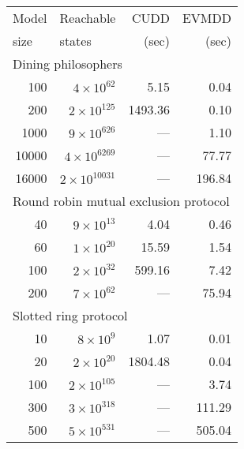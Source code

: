\documentclass[nocover]             %
{NASA}                       %
\begin{document}
{\small
\begin{table}[htb]
  \begin{center}
    \begin{tabular}{|r||r||r|r|}
      \hline
      \multicolumn{1}{|l||}{Model} & \multicolumn{1}{l||}{Reachable} & CUDD & EVMDD \\
      \multicolumn{1}{|l||}{size}  & \multicolumn{1}{l||}{states}  & (sec) & (sec) \\
      \hline
      \multicolumn{4}{|l|}{Dining philosophers}\\
      \hline
      100 & $4\times10^{62}$ &    5.15 &    0.04 \\
      200 & $2\times10^{125}$ & 1493.36 &    0.10 \\
      1000 & $9\times10^{626}$ &   --- &    1.10 \\
      10000 & $4\times10^{6269}$ &   --- &   77.77 \\
      16000 & $2\times10^{10031}$ &   --- &  196.84 \\
      \hline
      \multicolumn{4}{|l|}{Round robin mutual exclusion protocol}\\
      \hline
      40 & $9\times10^{13}$ &    4.04 &    0.46 \\
      60 & $1\times10^{20}$ &   15.59 &    1.54 \\
      100 & $2\times10^{32}$ &  599.16 &    7.42 \\
      200 & $7\times10^{62}$ &   --- &   75.94 \\
      \hline
      \multicolumn{4}{|l|}{Slotted ring protocol}\\
      \hline
      10 & $8\times10^{9}$    &    1.07 &    0.01 \\
      20 & $2\times10^{20}$   & 1804.48 &    0.04 \\
      100 & $2\times10^{105}$ &   --- &    3.74 \\
      300 & $3\times10^{318}$ &   --- &  111.29 \\
      500 & $5\times10^{531}$ &   --- &  505.04 \\
      \hline
    \end{tabular}

\end{center}
\end{table}}
\end{document}
